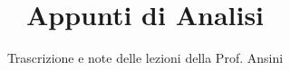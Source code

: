 \documentclass[a4paper,12pt]{article}
\title{Appunti di Analisi}
\author{Trascrizione e note delle lezioni della Prof. Ansini}
\date{}
\begin{document}
\maketitle
\projectintro
\tableofcontents
\newpage

% 
% 
% 
% 
% 
\end{document}
